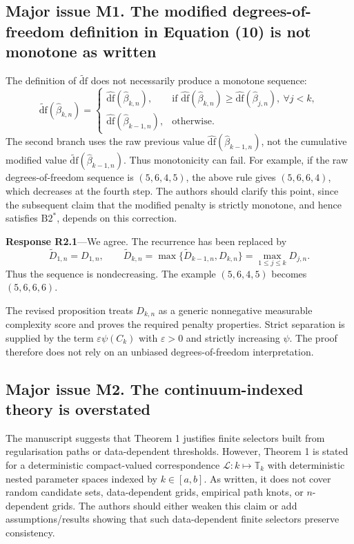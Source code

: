 \documentclass[11pt]{article}
\newcommand{\response}[1]{\par\noindent\textbf{Response #1}---}
\begin{document}
\subsection*{Major issue M1. The modified degrees-of-freedom definition in Equation (10) is not monotone as written}
The definition of $\widetilde{\mathrm{df}}$ does not necessarily produce a monotone sequence:
\[
\widetilde{\mathrm{df}}(\widehat\beta_{k,n})=
\begin{cases}
\widehat{\mathrm{df}}(\widehat\beta_{k,n}), & \text{if }\widehat{\mathrm{df}}(\widehat\beta_{k,n})\geq\widehat{\mathrm{df}}(\widehat\beta_{j,n}),\ \forall j<k,\\
\widehat{\mathrm{df}}(\widehat\beta_{k-1,n}), & \text{otherwise.}
\end{cases}
\]
The second branch uses the raw previous value $\widehat{\mathrm{df}}(\widehat\beta_{k-1,n})$, not the cumulative modified value $\widetilde{\mathrm{df}}(\widehat\beta_{k-1,n})$. Thus monotonicity can fail. For example, if the raw degrees-of-freedom sequence is $(5,6,4,5)$, the above rule gives $(5,6,6,4)$, which decreases at the fourth step. The authors should clarify this point, since the subsequent claim that the modified penalty is strictly monotone, and hence satisfies $\mathrm{B2}^*$, depends on this correction.

\response{R2.1}We agree. The recurrence has been replaced by
\[
\widetilde D_{1,n}=D_{1,n},\qquad
\widetilde D_{k,n}=\max\{\widetilde D_{k-1,n},D_{k,n}\}
=\max_{1\le j\le k}D_{j,n}.
\]
Thus the sequence is nondecreasing. The example $(5,6,4,5)$ becomes $(5,6,6,6)$.

The revised proposition treats $D_{k,n}$ as a generic nonnegative measurable complexity score and proves the required penalty properties. Strict separation is supplied by the term $\varepsilon\psi(C_k)$ with $\varepsilon>0$ and strictly increasing $\psi$. The proof therefore does not rely on an unbiased degrees-of-freedom interpretation.

\subsection*{Major issue M2. The continuum-indexed theory is overstated}
The manuscript suggests that Theorem 1 justifies finite selectors built from regularisation paths or data-dependent thresholds. However, Theorem 1 is stated for a deterministic compact-valued correspondence $\mathcal L:k\mapsto\mathbb T_k$ with deterministic nested parameter spaces indexed by $k\in[a,b]$. As written, it does not cover random candidate sets, data-dependent grids, empirical path knots, or $n$-dependent grids. The authors should either weaken this claim or add assumptions/results showing that such data-dependent finite selectors preserve consistency.
\end{document}
